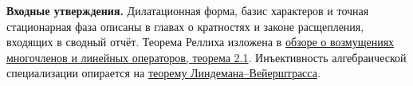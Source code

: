 \documentclass[11pt,a4paper]{article}
\newcommand{\subt}[1]{\par\medskip\noindent\textbf{#1.}\quad}
\begin{document}
\subt{Входные утверждения}
Дилатационная форма, базис характеров и точная стационарная фаза описаны в главах о кратностях и законе расщепления, входящих в сводный отчёт. Теорема Реллиха изложена в 
\href{https://www.mat.univie.ac.at/~armin/publ/handbook_paper.pdf}{обзоре о возмущениях многочленов и линейных операторов, теорема 2.1}. Инъективность алгебраической специализации опирается на 
\href{https://encyclopediaofmath.org/wiki/Lindemann_theorem}{теорему Линдемана--Вейерштрасса}.
\end{document}
